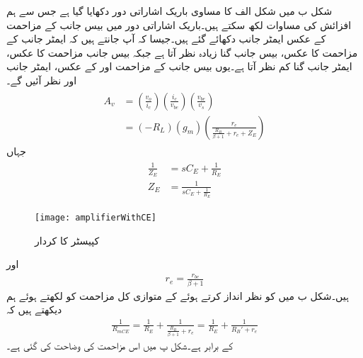 شکل  ب میں شکل  الف کا مساوی باریک اشاراتی دور دکھایا گیا ہے جس سے ہم افزائش کی مساوات لکھ سکتے ہیں۔باریک اشاراتی دور میں بیس  جانب کے مزاحمت کے عکس ایمٹر جانب دکھائے گئے ہیں۔جیسا کہ آپ جانتے ہیں کہ ایمٹر جانب کے مزاحمت کا عکس،  بیس  جانب  گنا زیادہ نظر آتا ہے جبکہ بیس  جانب مزاحمت کا عکس، ایمٹر جانب  گنا کم نظر آتا ہے۔یوں بیس  جانب کے مزاحمت  اور  کے عکس، ایمٹر جانب  اور  نظر آئیں گے۔
\begin{gather} \label{مساوات_تعددی_ردعمل_مخارج_کپیسٹر_کا_کردار}
\begin{aligned} 
A_v&=\left(\frac{v_o}{i_c} \right ) \left(\frac{i_c}{v_{be}} \right ) \left(\frac{v_{be}}{v_s} \right )\\
&=\left(-R_L \right ) \left(g_m \right ) \left (\frac{r_e}{\frac{R_B}{\beta+1}+r_e+Z_E }\right )
\end{aligned}
\end{gather}
جہاں
\begin{gather} \label{مساوات_تعددی_ردعمل_مخارج_کپیسٹر_اور_رکاوٹ}
\begin{aligned}
\frac{1}{Z_E}&=s C_E+\frac{1}{R_E}\\
Z_E&=\frac{1}{s C_E +\frac{1}{R_E}}
\end{aligned}
\end{gather}
%
\begin{figure}
\centering
\texttt{[image: amplifierWithCE]}
\caption{کپیسٹر  کا کردار}
\label{شکل_مخارج_کپیسٹر_کا_کردار}
\end{figure}
اور
\begin{align}
r_e=\frac{r_{be}}{\beta+1}
\end{align}
ہیں۔شکل  ب میں   کو نظر انداز کرتے ہوئے   کے متوازی کل مزاحمت کو  لکھتے ہوئے ہم دیکھتے ہیں کہ
\begin{align} \label{مساوات_تعددی_ردعمل_مخارج_کپیسٹر_کے_متوازی_مزاحمت}
\frac{1}{R_{mCE}}=\frac{1}{R_E}+\frac{1}{\frac{R_B}{\beta+1}+r_e}=\frac{1}{R_E}+\frac{1}{R_B'+r_e}
\end{align}
کے برابر ہے۔شکل  پ میں اس مزاحمت کی وضاحت کی گئی ہے۔

